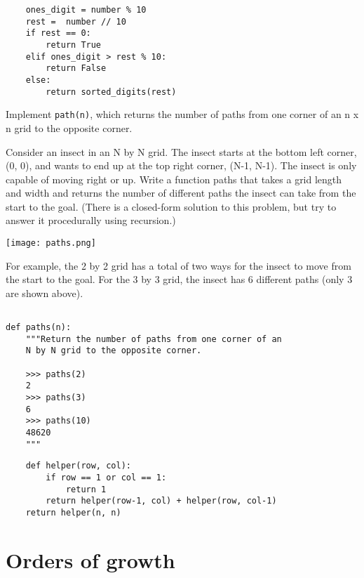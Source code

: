\documentclass{exam}
\begin{document}
\begin{questions}
\begin{blocksection}
\begin{solution}[1.5in]
\begin{lstlisting}
    ones_digit = number % 10
    rest =  number // 10
    if rest == 0:
        return True
    elif ones_digit > rest % 10:
        return False
    else:
        return sorted_digits(rest)
\end{lstlisting}
\end{solution}
\end{blocksection}

\begin{blocksection}
\question Implement \texttt{path(n)}, which returns the number of paths from
one corner of an n x n grid to the opposite corner.

Consider an insect in an N by N grid. The insect starts at the bottom left
corner, (0, 0), and wants to end up at the top right corner, (N-1, N-1). The
insect is only capable of moving right or up. Write a function paths that takes
a grid length and width and returns the number of different paths the insect can
take from the start to the goal. (There is a closed-form solution to this
problem, but try to answer it procedurally using recursion.)

\centerline{\texttt{[image: paths.png]}}

For example, the 2 by 2 grid has a total of two ways for the insect to move from
the start to the goal. For the 3 by 3 grid, the insect has 6 different paths
(only 3 are shown above).

\begin{lstlisting}

def paths(n):
    """Return the number of paths from one corner of an
    N by N grid to the opposite corner.

    >>> paths(2)
    2
    >>> paths(3)
    6
    >>> paths(10)
    48620
    """
\end{lstlisting}

\begin{solution}[1.5in]
\begin{lstlisting}
    def helper(row, col):
        if row == 1 or col == 1:
            return 1
        return helper(row-1, col) + helper(row, col-1)
    return helper(n, n)
\end{lstlisting}
\end{solution}

\end{blocksection}
\end{questions}

\section{Orders of growth}
\end{document}

